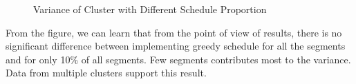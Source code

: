 \begin{figure}[ht]
    \centering
    
    \centering
    \caption{Variance of Cluster with Different Schedule Proportion}
    \label{fig3.2-3}
\end{figure}

From the figure, we can learn that from the point of view of results, there is no significant difference between implementing greedy schedule for all the segments and for only 10\% of all segments. Few segments contributes most to the variance. Data from multiple clusters support this result.
